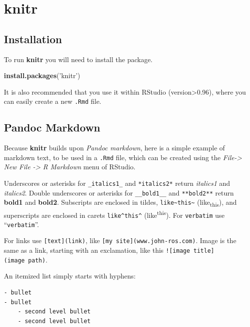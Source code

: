 \documentclass[]{book}
\newenvironment{Shaded}{\begin{snugshade}}{\end{snugshade}}
\newcommand{\KeywordTok}[1]{\textcolor[rgb]{0.13,0.29,0.53}{\textbf{{#1}}}}
\newcommand{\StringTok}[1]{\textcolor[rgb]{0.31,0.60,0.02}{{#1}}}
\newcommand{\NormalTok}[1]{{#1}}
\theoremstyle{definition}
\theoremstyle{definition}
\theoremstyle{remark}
\begin{document}
\section{knitr}\label{knitr}

\subsection{Installation}\label{installation}

To run \textbf{knitr} you will need to install the package.

\begin{Shaded}
\begin{Highlighting}[]
\KeywordTok{install.packages}\NormalTok{(}\StringTok{'knitr'}\NormalTok{)}
\end{Highlighting}
\end{Shaded}

It is also recommended that you use it within RStudio
(version\textgreater{}0.96), where you can easily create a new
\texttt{.Rmd} file.

\subsection{Pandoc Markdown}\label{pandoc-markdown}

Because \textbf{knitr} builds upon \emph{Pandoc markdown}, here is a
simple example of markdown text, to be used in a \texttt{.Rmd} file,
which can be created using the \emph{File-\textgreater{} New File
-\textgreater{} R Markdown} menu of RStudio.

Underscores or asterisks for \texttt{\_italics1\_} and
\texttt{*italics2*} return \emph{italics1} and \emph{italics2}. Double
underscores or asterisks for \texttt{\_\_bold1\_\_} and
\texttt{**bold2**} return \textbf{bold1} and \textbf{bold2}. Subscripts
are enclosed in tildes,
\texttt{like\textasciitilde{}this\textasciitilde{}}
(like\textsubscript{this}), and superscripts are enclosed in carets
\texttt{like\^{}this\^{}} (like\textsuperscript{this}). For
\texttt{verbatim} use ``\texttt{verbatim}''.

For links use \texttt{{[}text{]}(link)}, like
\texttt{{[}my\ site{]}(www.john-ros.com)}. Image is the same as a link,
starting with an exclamation, like this
\texttt{!{[}image\ title{]}(image\ path)}.

An itemized list simply starts with hyphens:

\begin{verbatim}
- bullet
- bullet
    - second level bullet
    - second level bullet
\end{verbatim}
\end{document}
